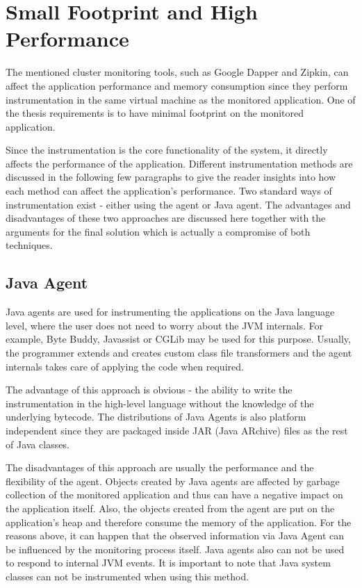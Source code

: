 \section{Small Footprint and High Performance}
The mentioned cluster monitoring tools, such as Google Dapper and Zipkin, can affect the application performance and memory consumption since they perform instrumentation in the same virtual machine as the monitored application. One of the thesis requirements is to have minimal footprint on the monitored application.

Since the instrumentation is the core functionality of the system, it directly affects the performance of the application. Different instrumentation methods are discussed in the following few paragraphs to give the reader insights into how each method can affect the application's performance. Two standard ways of instrumentation exist - either using the agent or Java agent. The advantages and disadvantages of these two approaches are discussed here together with the arguments for the final solution which is actually a compromise of both techniques.
\subsection{Java Agent}
\label{java_agent}
Java agents are used for instrumenting the applications on the Java language level, where the user does not need to worry about the JVM internals. For example, Byte Buddy, Javassist or CGLib may be used for this purpose. Usually, the programmer extends and creates custom class file transformers and the agent internals takes care of applying the code when required. 

The advantage of this approach is obvious - the ability to write the instrumentation in the high-level language without the knowledge of the underlying bytecode. The distributions of Java Agents is also platform independent since they are packaged inside JAR (Java ARchive) files as the rest of Java classes. 

The disadvantages of this approach are usually the performance and the flexibility of the agent. Objects created by Java agents are affected by garbage collection of the monitored application and thus can have a negative impact on the application itself. Also, the objects created from the agent are put on the application's heap and therefore consume the memory of the application. For the reasons above, it can happen that the observed information via Java Agent can be influenced by the monitoring process itself. Java agents also can not be used to respond to internal JVM events. It is important to note that Java system classes can not be instrumented when using this method.
